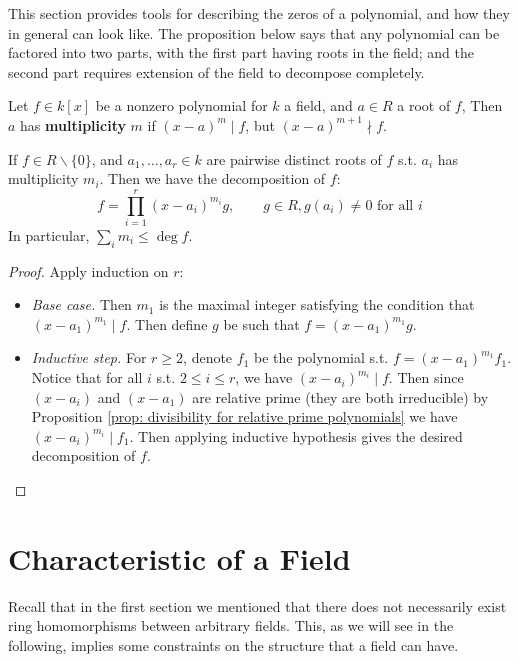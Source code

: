 \documentclass{article}
\begin{document}
\textstart
This section provides tools for describing the zeros of a polynomial, and how they in general can look like. The proposition below says that any polynomial can be factored into two parts, with the first part having roots in the field; and the second part requires extension of the field to decompose completely. 

\begin{definition}[Multiplicity]
    Let $f \in k[x]$ be a nonzero polynomial for $k$ a field, and $a \in R$ a root of $f$, Then $a$ has \textbf{multiplicity} $m$ if $(x - a)^m \mid f$, but $(x - a)^{m + 1} \nmid f$.
\end{definition}

\begin{proposition}
    If $f \in R \smallsetminus \{0\}$, and $a_1, \dots, a_r \in k$ are pairwise distinct roots of $f$ s.t. $a_i$ has multiplicity $m_i$. Then we have the decomposition of $f$: 
    \[
        f = \prod_{i = 1}^r (x - a_i)^{m_i} g, \qquad g \in R, \text{$g(a_i) \neq 0$ for all $i$}
    \]
    In particular, $\sum_{i} m_i \leq \deg f$.
\end{proposition}

\begin{proof}
    Apply induction on $r$: 
    \begin{itemize}
        \item \emph{Base case.} Then $m_1$ is the maximal integer satisfying the condition that $(x - a_1)^{m_1} \mid f$. Then define $g$ be such that $f = (x - a_1)^{m_1} g$. 
        \item \emph{Inductive step.} For $r \geq 2$,  denote $f_1$ be the polynomial s.t. $f = (x - a_1)^{m_1} f_1$. Notice that for all $i$ s.t. $2 \leq i \leq r$, we have $(x - a_i)^{m_i} \mid f$. Then since $(x - a_i)$ and $(x - a_1)$ are relative prime (they are both irreducible) by Proposition \ref{prop: divisibility for relative prime polynomials} we have $(x - a_i)^{m_i} \mid f_1$. Then applying inductive hypothesis gives the desired decomposition of $f$. 
    \end{itemize}
\end{proof}

\section{Characteristic of a Field}

\textstart
Recall that in the first section we mentioned that there does not necessarily exist ring homomorphisms between arbitrary fields. This, as we will see in the following, implies some constraints on the structure that a field can have.
\end{document}
